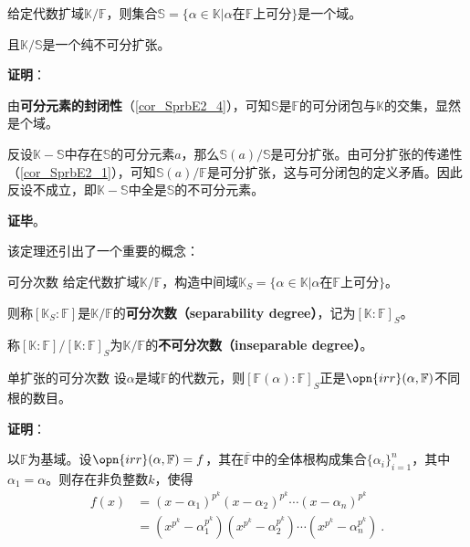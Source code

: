 \begin{theorem}{}\label{the_PInsEx_3}
给定代数扩域$\mathbb{K}/\mathbb{F}$，则集合$\mathbb{S}=\{\alpha\in\mathbb{K}|\alpha\text{在}\mathbb{F}\text{上可分}\}$是一个域。

且$\mathbb{K}/\mathbb{S}$是一个纯不可分扩张。
\end{theorem}

\textbf{证明}：

由\textbf{可分元素的封闭性}（\autoref{cor_SprbE2_4}），可知$\mathbb{S}$是$\mathbb{F}$的可分闭包与$\mathbb{K}$的交集，显然是个域。

反设$\mathbb{K}-\mathbb{S}$中存在$\mathbb{S}$的可分元素$a$，那么$\mathbb{S}(a)/\mathbb{S}$是可分扩张。由可分扩张的传递性（\autoref{cor_SprbE2_1}），可知$\mathbb{S}(a)/\mathbb{F}$是可分扩张，这与可分闭包的定义矛盾。因此反设不成立，即$\mathbb{K}-\mathbb{S}$中全是$\mathbb{S}$的不可分元素。

\textbf{证毕}。

该定理还引出了一个重要的概念：

\begin{definition}{可分次数}
给定代数扩域$\mathbb{K}/\mathbb{F}$，构造中间域$\mathbb{K}_S=\{\alpha\in\mathbb{K}|\alpha\text{在}\mathbb{F}\text{上可分}\}$。

则称$[\mathbb{K}_S:\mathbb{F}]$是$\mathbb{K}/\mathbb{F}$的\textbf{可分次数（separability degree）}，记为$[\mathbb{K}:\mathbb{F}]_S$。

称$[\mathbb{K}:\mathbb{F}] / [\mathbb{K}:\mathbb{F}]_S$为$\mathbb{K}/\mathbb{F}$的\textbf{不可分次数（inseparable degree）}。
\end{definition}


\begin{theorem}{单扩张的可分次数}\label{the_PInsEx_4}
设$\alpha$是域$\mathbb{F}$的代数元，则$[\mathbb{F}(\alpha):\mathbb{F}]_S$正是$\opn{irr}(\alpha, \mathbb{F})$不同根的数目。
\end{theorem}

\textbf{证明}：

以$\mathbb{F}$为基域。设$\opn{irr}(\alpha, \mathbb{F})=f$，其在$\overline{\mathbb{F}}$中的全体根构成集合$\{\alpha_i\}_{i=1}^n$，其中$\alpha_1=\alpha$。则存在非负整数$k$，使得
\begin{equation}
\begin{aligned}
f(x) &= (x-\alpha_1)^{p^k}(x-\alpha_2)^{p^k}\cdots(x-\alpha_n)^{p^k}\\
&=(x^{p^k}-\alpha^{p^k}_1)(x^{p^k}-\alpha^{p^k}_2)\cdots(x^{p^k}-\alpha^{p^k}_n)~.
\end{aligned}
\end{equation}

